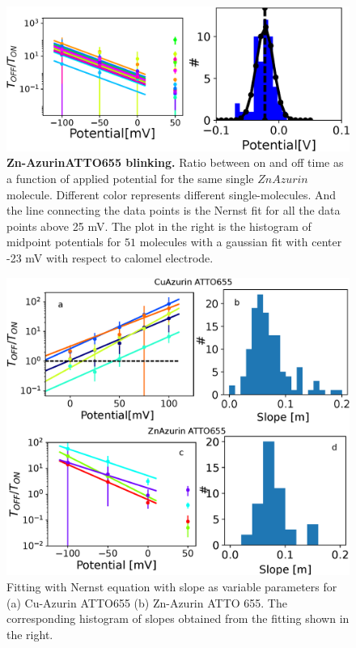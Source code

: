 \documentclass[11pt,a4paper,onecolumn]{article}
\begin{document}
\begin{figure}
  \centering
  \includegraphics[width=\textwidth,keepaspectratio]{Figure_SI/SI_potential_Zn.eps}
	\makeatletter
	\renewcommand{\fnum@figure}{\figurename~S\thefigure}
	\makeatother
  \caption{\textbf{Zn-AzurinATTO655 blinking.} Ratio between on and off time as a function of applied potential for the same single $ZnAzurin$ molecule. Different color represents different single-molecules. And the line connecting the data points is the Nernst fit for all the data points above 25 mV. The plot in the right is the histogram of midpoint potentials for $51$ molecules with a gaussian fit with center -23 mV with respect to calomel electrode.}
  \label{SIfig:2Dhist_Zn}
\end{figure}
\begin{figure}
  \centering
  \includegraphics[width=\textwidth,keepaspectratio]{Figure_SI/SI_potential_slope.eps}
	\makeatletter
	\renewcommand{\fnum@figure}{\figurename~S\thefigure}
	\makeatother
  \caption{Fitting with Nernst equation with slope as variable parameters for  (a) Cu-Azurin ATTO655 (b) Zn-Azurin ATTO 655. The corresponding histogram of slopes obtained from the fitting shown in the right.}
  \label{SIfig:potential_slope}
\end{figure}
\end{document}
